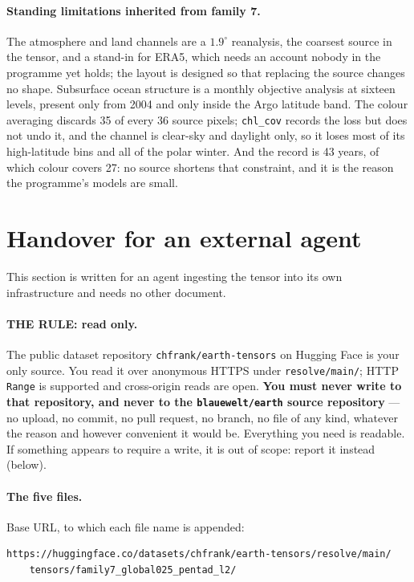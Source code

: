 \documentclass[10pt]{article}
\newcommand{\code}[1]{\texttt{#1}}
\begin{document}
\paragraph{Standing limitations inherited from family 7.} The atmosphere and
land channels are a $1.9^\circ$ reanalysis, the coarsest source in the tensor,
and a stand-in for ERA5, which needs an account nobody in the programme yet
holds; the layout is designed so that replacing the source changes no shape.
Subsurface ocean structure is a monthly objective analysis at sixteen levels,
present only from 2004 and only inside the Argo latitude band. The colour
averaging discards 35 of every 36 source pixels; \code{chl\_cov} records the
loss but does not undo it, and the channel is clear-sky and daylight only, so
it loses most of its high-latitude bins and all of the polar winter. And the
record is 43 years, of which colour covers 27: no source shortens that
constraint, and it is the reason the programme's models are small.

\section{Handover for an external agent}

This section is written for an agent ingesting the tensor into its own
infrastructure and needs no other document.

\paragraph{THE RULE: read only.} The public dataset repository
\code{chfrank/earth-tensors} on Hugging Face is your only source. You read it
over anonymous HTTPS under \code{resolve/main/}; HTTP \code{Range} is
supported and cross-origin reads are open. \textbf{You must never write to that repository, and never to
the \code{blauewelt/earth} source repository} --- no upload, no commit, no
pull request, no branch, no file of any kind, whatever the reason and however
convenient it would be. Everything you need is readable. If something appears
to require a write, it is out of scope: report it instead (below).

\paragraph{The five files.} Base URL, to which each file name is appended:
\begin{verbatim}
https://huggingface.co/datasets/chfrank/earth-tensors/resolve/main/
    tensors/family7_global025_pentad_l2/
\end{verbatim}
\end{document}

